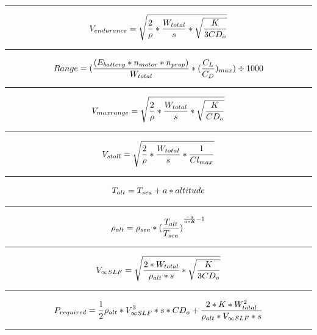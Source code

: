 \documentclass[12pt,A4paper]{article}
\begin{document}
\begin{multicols*}{2}
\begin{equation}
		\end{equation}
		\hrule
		\vspace{0.1 in}
		\begin{equation}
			V_{endurance} = \sqrt{\frac{2}{\rho} * \frac{W_{total}}{s} * \sqrt{\frac{K}{3  CD_o}}} \\
		\end{equation}
		\hrule
		\vspace{0.1 in}
		\begin{equation}
			Range = (\frac{(E_{battery} * n_{motor} * n_{prop})}{W_{total}} * (\frac{C_L}{C_D})_{max}) \div 1000 \\
		\end{equation}
		\hrule
		\vspace{0.1 in}
		\begin{equation}
			V_{maxrange} = \sqrt{\frac{2}{\rho} * \frac{W_{total}}{s} * \sqrt{\frac{K}{CD_o}}}\\
		\end{equation}
		\hrule
		\vspace{0.1 in}
		\begin{equation}
			V_{stall} = \sqrt{\frac{2}{\rho}*\frac{W_{total}}{s}*\frac{1}{Cl_{max}}} \\
		\end{equation}
		\hrule
		\vspace{0.1 in}
		\begin{equation}
			T_{alt} = T_{sea} + a*altitude \\
		\end{equation}
		\hrule
		\vspace{0.1 in}
		\begin{equation}
			\rho_{alt} = \rho_{sea} * {(\frac{T_{alt}}{T_{sea}})}^{\frac{-g}{a*R}-1}\\
		\end{equation}
		\hrule
		\vspace{0.1 in}
		\begin{equation}
			V_{\infty SLF} = \sqrt{\frac{2*W_{total}}{\rho_{alt} * s} * \sqrt{\frac{K}{3CD_o}}}\\
		\end{equation}
		\hrule
		\vspace{0.1 in}
		\begin{equation}
			P_{required} = \frac{1}{2} \rho_{alt} * V_{\infty SLF}^3 * s * CD_o + \frac{2 * K * W_{total}^2}{\rho_{alt}*V_{\infty SLF}*s} \\
		\end{equation}
		\hrule
		\vspace{0.1 in}

\end{multicols*}
\end{document}

